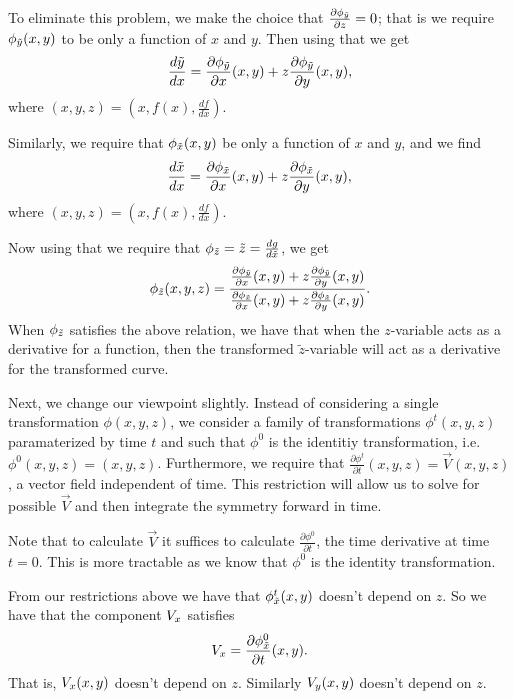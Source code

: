 To eliminate this problem, we make the choice that
\(\frac{\partial \phi_{\tilde y}}{\partial z} = 0\); that is we require \(\phi_{\tilde y} (x, y)\) to be only a function of \(x\) and
\(y\). Then using that we get
\begin{equation}
\frac{d\tilde y}{dx} = \frac{\partial \phi_{\tilde y}}{\partial x} (x, y)
    + z \frac{\partial \phi_{\tilde y}}{\partial y} (x, y),
\end{equation}
where \((x, y, z) = \left(x, f(x), \frac{df}{dx}\right)\).

Similarly, we require that \(\phi_{\tilde x}(x,y)\) be only a function of \(x\) and \(y\), and we find
\begin{equation}
\frac{d\tilde x}{dx} = \frac{\partial \phi_{\tilde x}}{\partial x} (x, y)
     + z \frac{\partial \phi_{\tilde x}}{\partial y} (x, y),
\end{equation}
where \((x,y,z) = \left(x, f(x), \frac{df}{dx} \right)\). 

Now using that we require that \(\phi_{\tilde z} = \tilde z = \frac{d g}{d \tilde x}\), we get
\begin{equation} \label{lie:eq:phiz}
\phi_{\tilde z} (x, y, z) = \frac{\frac{\partial \phi_{\tilde y}}{\partial x} (x, y)
            + z \frac{\partial \phi_{\tilde y}}{\partial y} (x, y)} 
    {\frac{\partial \phi_{\tilde x}}{\partial x} (x, y)
            + z \frac{\partial \phi_{\tilde x}}{\partial y} (x, y)}.
\end{equation}
When \(\phi_{\tilde z}\) satisfies the above relation, we have that when the \(z\)-variable acts as a derivative
for a function, then the transformed \(\tilde z\)-variable will act as a derivative for the transformed
curve. 

Next, we change our viewpoint slightly. Instead of considering a single transformation \(\phi(x,y,z)\), we 
consider a family of transformations \(\phi^t (x,y, z)\) paramaterized by time \(t\) and such that
\(\phi^0\) is the identitiy transformation, i.e. \(\phi^0 (x,y,z) = (x, y, z)\). Furthermore, we require
that \(\frac {\partial \phi^t}{\partial t} (x, y,z) = \vec V(x,y, z)\), a vector field independent 
of time. This restriction
will allow us to solve for possible \(\vec V\) and then integrate the symmetry forward in time.

Note that to calculate \(\vec V\) it suffices to calculate \(\frac{\partial \phi^0}{\partial t}\), the time derivative
at time \(t = 0\). This is more tractable as we know that \(\phi^0\) is the identity transformation. 

From our restrictions above we have that \(\phi_{\tilde x}^t (x,y)\) doesn't depend on \(z\). So we have that the
component \(V_x\) satisfies
\begin{equation}
V_x = \frac{\partial \phi_{\tilde x}^0}{\partial t} (x, y).
\end{equation}
That is, \(V_x(x,y)\) doesn't depend on \(z\). Similarly \(V_y(x,y)\) doesn't depend on \(z\).

